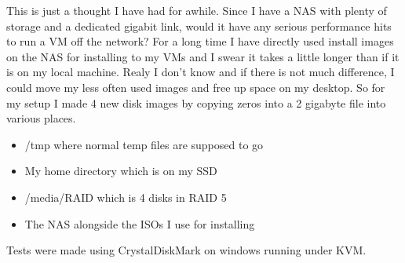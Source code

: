 \documentclass[12pt]{article}
\begin{document}
This is just a thought I have had for awhile.
Since I have a NAS with plenty of storage and a dedicated gigabit link, would it have any serious performance hits to run a VM off the network?
For a long time I have directly used install images on the NAS for installing to my VMs and I swear it takes a little longer than if it is on my local machine.
Realy I don't know and if there is not much difference, I could move my less often used images and free up space on my desktop.
So for my setup I made 4 new disk images by copying zeros into a 2 gigabyte file into various places.
\begin{itemize}
	\item /tmp where normal temp files are supposed to go
	\item My home directory which is on my SSD
	\item /media/RAID which is 4 disks in RAID 5
	\item The NAS alongside the ISOs I use for installing
\end{itemize}
Tests were made using CrystalDiskMark on windows running under KVM.
\end{document}
